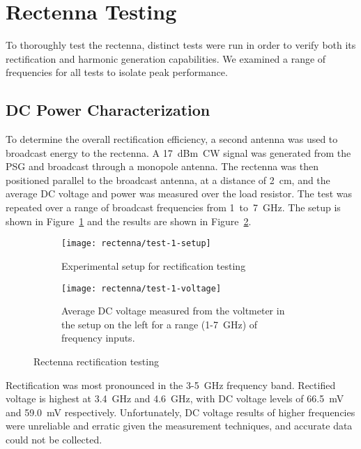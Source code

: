 \section{Rectenna Testing}
\label{sec:rectenna-testing}

To thoroughly test the rectenna, distinct tests were run in order to verify both its rectification and harmonic generation capabilities. We examined a range of frequencies for all tests to isolate peak performance.

\subsection{DC Power Characterization}

To determine the overall rectification efficiency, a second antenna was used to broadcast energy to the rectenna. A 17~dBm~CW signal was generated from the PSG and broadcast through a monopole antenna. The rectenna was then positioned parallel to the broadcast antenna, at a distance of 2~cm, and the average DC voltage and power was measured over the load resistor. The test was repeated over a range of broadcast frequencies from 1~to~7~GHz. The setup is shown in Figure~\ref{fig:rectenna-test-1-setup} and the results are shown in Figure~\ref{fig:rectenna-test-1-voltage}.


\begin{figure}[]
    \centering
    \begin{subfigure}{.85\textwidth}
        \centering
        \texttt{[image: rectenna/test-1-setup]}
        \caption{Experimental setup for rectification testing}
        \label{fig:rectenna-test-1-setup}
    \end{subfigure}
		\par\bigskip
    \begin{subfigure}{.85\textwidth}
        \centering
        \texttt{[image: rectenna/test-1-voltage]}
        \caption{Average DC voltage measured from the voltmeter in the setup on the left for a range (1-7~GHz) of frequency inputs.}
        \label{fig:rectenna-test-1-voltage}
    \end{subfigure}
    \caption[Rectenna Rectification]{Rectenna rectification testing}
    \label{fig:rectenna-test-1}
\end{figure}

Rectification was most pronounced in the 3-5~GHz frequency band. Rectified voltage is highest at 3.4~GHz and 4.6~GHz, with DC voltage levels of 66.5~mV and 59.0~mV respectively. Unfortunately, DC voltage results of higher frequencies were unreliable and erratic given the measurement techniques, and accurate data could not be collected.


